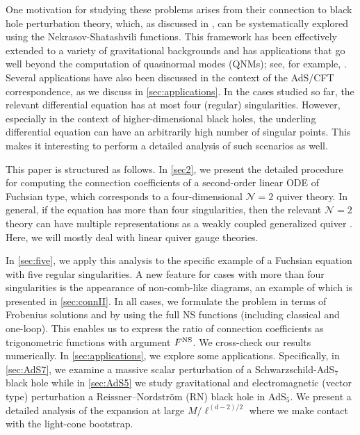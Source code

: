 \documentclass[11pt]{article}
\numberwithin{equation}{section}
\begin{document}
One motivation for studying these problems arises from their connection to black hole perturbation theory, which, as discussed in \cite{Aminov:2020yma}, can be systematically explored using the Nekrasov-Shatashvili  functions. This framework has been effectively extended to a variety of gravitational backgrounds and has applications that go well beyond the computation of quasinormal modes (QNMs); see, for example, \cite{Aminov:2020yma,Bonelli:2021uvf,Casals:2021ugr,Bianchi:2021mft,Consoli:2022eey,Bianchi:2022wku,daCunha:2022ewy,Bianchi:2023rlt,Bautista:2023sdf,Bautista:2024agp,Fucito:2024wlg,Zhao:2024rrw,Cipriani:2024ygw,Bianchi:2024mlq,Arnaudo:2024bbd,Bianchi:2024rod,Matone:2024ytm,Arnaudo:2024rhv}. Several applications have also been discussed in the context of the AdS/CFT correspondence, as we discuss in \autoref{sec:applications}.
In the cases studied so far, the relevant differential equation has at most four (regular) singularities.
However, especially in the context of higher-dimensional black holes, the underling differential equation can have an arbitrarily high number of singular points. This makes it interesting to perform a detailed analysis of such scenarios as well. 

This paper is structured as follows. In \autoref{sec2}, we present the detailed procedure for computing the connection coefficients of a second-order linear ODE of Fuchsian type, which corresponds to a four-dimensional  \( \mathcal{N}=2 \) quiver  theory. 
In general, if the equation has more than four singularities, then the relevant  \( \mathcal{N}=2 \)  theory can have multiple representations as a weakly coupled generalized quiver \cite{Gaiotto:2009we}. Here,  we will mostly deal with linear quiver gauge theories. 



In \autoref{sec:five}, we apply this analysis to the specific example of a Fuchsian equation with five regular singularities. A new feature for cases with more than four singularities is the appearance of non-comb-like diagrams, an example of which is presented in \autoref{sec:connII}.
 In all cases, we formulate the problem in terms of Frobenius solutions and by using the full NS functions (including classical and one-loop). This enables us to express the ratio of connection coefficients as trigonometric functions with argument  $F^{\rm NS}$. We cross-check our results numerically. 
In \autoref{sec:applications}, we explore some applications. Specifically, in \autoref{sec:AdS7}, we examine a massive scalar perturbation of a Schwarzschild-AdS$_7$ black hole while in \autoref{sec:AdS5}  we study gravitational and electromagnetic (vector type) perturbation a   Reissner–Nordstr\"om (RN) black hole in AdS$_5$.
We present a detailed analysis of  the expansion at large $M/\ell^{(d-2)/2}$ where we make contact with the light-cone bootstrap. 
\end{document}
